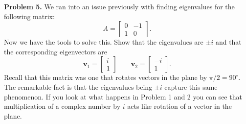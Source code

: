 \documentclass[12pt]{report} %
\theoremstyle{definition}
\begin{document}
\noindent\textbf{Problem 5.} We ran into an issue previously with finding eigenvalues for the following matrix:
\[
A=\begin{bmatrix} 0 & -1 \\ 1 & 0 \end{bmatrix}.
\]
Now we have the tools to solve this.  Show that the eigenvalues are $\pm i$ and that the corresponding eigenvectors are 
\[
\mathbf{v}_1 = \begin{bmatrix} i \\ 1 \end{bmatrix} \qquad \mathbf{v}_2 = \begin{bmatrix} -i \\ 1 \end{bmatrix}.
\]
Recall that this matrix was one that rotates vectors in the plane by $\pi/2=90^\circ$.  The remarkable fact is that the eigenvalues being $\pm i$ capture this same phenomenon.  If you look at what happens in Problem 1 and 2 you can see that multiplication of a complex number by $i$ acts like rotation of a vector in the plane.
\end{document}
